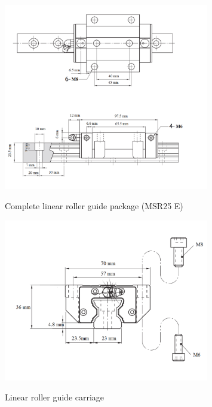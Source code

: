 \begin{figure} [H]
\centering
\includegraphics[width=0.8\textwidth]{figures/MechLBG1}
\caption{Complete linear roller guide package (MSR25 E) } \cite{Aluflex_LRG}
\label{fig:MechLRG1}
\end{figure}



\begin{figure} [H]
\centering
\includegraphics[width=0.8\textwidth]{figures/MechLBG2}
\caption{Linear roller guide carriage} \cite{Aluflex_LRG}
\label{fig:MechLRG2}
\end{figure}


